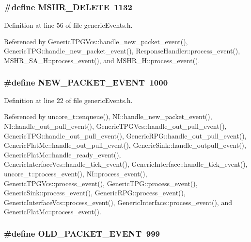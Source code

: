 \subsubsection[{MSHR\_\-DELETE}]{\setlength{\rightskip}{0pt plus 5cm}\#define MSHR\_\-DELETE~1132}\label{genericEvents_8h_ed2edda6637ec5339fe261866f3fe8a3}




Definition at line 56 of file genericEvents.h.

Referenced by GenericTPGVcs::handle\_\-new\_\-packet\_\-event(), GenericTPG::handle\_\-new\_\-packet\_\-event(), ResponseHandler::process\_\-event(), MSHR\_\-SA\_\-H::process\_\-event(), and MSHR\_\-H::process\_\-event().
\subsubsection[{NEW\_\-PACKET\_\-EVENT}]{\setlength{\rightskip}{0pt plus 5cm}\#define NEW\_\-PACKET\_\-EVENT~1000}\label{genericEvents_8h_273938bc0875dd481c5eb97a57a76eb6}




Definition at line 22 of file genericEvents.h.

Referenced by uncore\_\-t::enqueue(), NI::handle\_\-new\_\-packet\_\-event(), NI::handle\_\-out\_\-pull\_\-event(), GenericTPGVcs::handle\_\-out\_\-pull\_\-event(), GenericTPG::handle\_\-out\_\-pull\_\-event(), GenericRPG::handle\_\-out\_\-pull\_\-event(), GenericFlatMc::handle\_\-out\_\-pull\_\-event(), GenericSink::handle\_\-outpull\_\-event(), GenericFlatMc::handle\_\-ready\_\-event(), GenericInterfaceVcs::handle\_\-tick\_\-event(), GenericInterface::handle\_\-tick\_\-event(), uncore\_\-t::process\_\-event(), NI::process\_\-event(), GenericTPGVcs::process\_\-event(), GenericTPG::process\_\-event(), GenericSink::process\_\-event(), GenericRPG::process\_\-event(), GenericInterfaceVcs::process\_\-event(), GenericInterface::process\_\-event(), and GenericFlatMc::process\_\-event().
\subsubsection[{OLD\_\-PACKET\_\-EVENT}]{\setlength{\rightskip}{0pt plus 5cm}\#define OLD\_\-PACKET\_\-EVENT~999}\label{genericEvents_8h_c43195ad996a45c7969cfaf9a52e0f4d}




